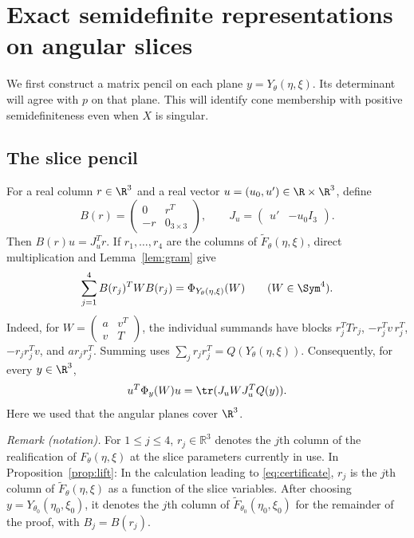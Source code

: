 \section{Exact semidefinite representations on angular slices}
\label{sec:slices}

We first construct a matrix pencil on each plane $y=Y_\theta(\eta,\xi)$.
Its determinant will agree with $p$ on that plane. This will identify
cone membership with positive semidefiniteness even when $X$ is singular.



\subsection{The slice pencil}
For a real column $r\in\R^3$ and a real vector
$u=(u_0,u')\in\R\times\R^3$, define
\begin{equation}\label{eq:BJ}
 B(r)=\begin{pmatrix}0&r^T\\-r&0_{3\times3}\end{pmatrix},
 \qquad J_u=\begin{pmatrix}u'&-u_0I_3\end{pmatrix}.
\end{equation}
Then $B(r)u=J_u^Tr$. If $r_1,\ldots,r_4$ are the columns of
$\widetilde F_\theta(\eta,\xi)$, direct multiplication and
Lemma~\ref{lem:gram} give
\begin{equation}\label{eq:Phi-factor}
 \sum_{j=1}^4 B(r_j)^TWB(r_j)
       =\Phi_{Y_\theta(\eta,\xi)}(W)
       \qquad(W\in\Sym^4).
\end{equation}
Indeed, for $W=\left(\begin{smallmatrix}a&v^T\\v&T\end{smallmatrix}\right)$,
the individual summands have blocks
$r_j^TTr_j$, $-r_j^Tv\,r_j^T$, $-r_jr_j^Tv$, and $a r_jr_j^T$.
Summing uses $\sum_jr_jr_j^T=Q(Y_\theta(\eta,\xi))$.
Consequently, for every $y\in\R^3$,
\begin{equation}\label{eq:Phi-quadratic}
 u^T\Phi_y(W)u=\tr(J_uWJ_u^TQ(y)).
\end{equation}
Here we used that the angular planes cover $\R^3$.

\noindent\textit{Remark (notation).} For $1\leq j\leq4$, $r_j\in\mathbb R^3$ denotes the $j$th column of the realification of $F_\theta(\eta,\xi)$ at the slice parameters currently in use. In Proposition~\ref{prop:lift}: In the calculation leading to \eqref{eq:certificate}, $r_j$ is the $j$th column of $\widetilde F_\theta(\eta,\xi)$ as a function of the slice variables. After choosing $y=Y_{\theta_0}(\eta_0,\xi_0)$, it denotes the $j$th column of $\widetilde F_{\theta_0}(\eta_0,\xi_0)$ for the remainder of the proof, with $B_j=B(r_j)$.


